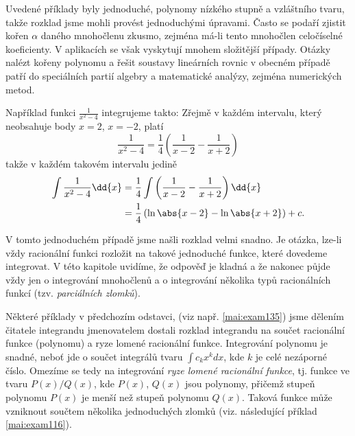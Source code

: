       Uvedené příklady byly jednoduché, polynomy nízkého stupně a vzláštního tvaru, takže rozklad
      jsme mohli provést jednoduchými úpravami. Často se podaří zjistit kořen \(\alpha\) daného
      mnohočlenu zkusmo, zejména má-li tento mnohočlen celočíselné koeficienty. V aplikacích se však
      vyskytují mnohem složitější případy. Otázky nalézt kořeny polynomu a řešit soustavy lineárních
      rovnic v obecném případě patří do speciálních partií algebry a matematické analýzy, zejména
      numerických metod.
      
      Například funkci \(\frac{1}{x^2-4}\) integrujeme takto: Zřejmě v každém intervalu, který
      neobsahuje body \(x=2\), \(x=-2\), platí
      \begin{equation*}
        \dfrac{1}{x^2-4} = \dfrac{1}{4}\left(\dfrac{1}{x-2} - \dfrac{1}{x+2}\right)
      \end{equation*}
      takže v každém takovém intervalu jedině
      \begin{align*}
        \int\dfrac{1}{x^2-4}\dd{x}  
          &= \dfrac{1}{4}\int\left(\dfrac{1}{x-2} - \dfrac{1}{x+2}\right)\dd{x}             \\
          &= \dfrac{1}{4}\left(\ln\abs{x-2} - \ln\abs{x+2}\right) + c.        
      \end{align*}

      V tomto jednoduchém případě jsme našli rozklad velmi snadno. Je otázka, lze-li vždy racionální
      funkci rozložit na takové jednoduché funkce, které dovedeme integrovat. V této kapitole
      uvidíme, že odpověď je kladná a že nakonec půjde vždy jen o integrování mnohočlenů a o
      integrování několika typů racionálních funkcí (tzv. \emph{parciálních zlomků}). 
      
    \newpage
      Některé příklady v předchozím odstavci, (viz např. \ref{mai:exam135}) jsme dělením čitatele
      integrandu jmenovatelem dostali rozklad integrandu na součet racionální funkce (polynomu) a
      ryze lomené racionální funkce. Integrování polynomu je snadné, neboť jde o součet integrálů
      tvaru \(\int c_kx^k dx\), kde \(k\) je celé nezáporné číslo. Omezíme se tedy na integrování
      \emph{ryze lomené racionální funkce},  tj. funkce ve tvaru \(P(x)/Q(x)\), kde \(P(x)\),
      \(Q(x)\) jsou polynomy, přičemž stupeň polynomu \(P(x)\) je menší než stupeň polynomu \(Q(x)\).
      Taková funkce může vzniknout součtem několika jednoduchých zlomků (viz. následující příklad
      \ref{mai:exam116}).      
      
